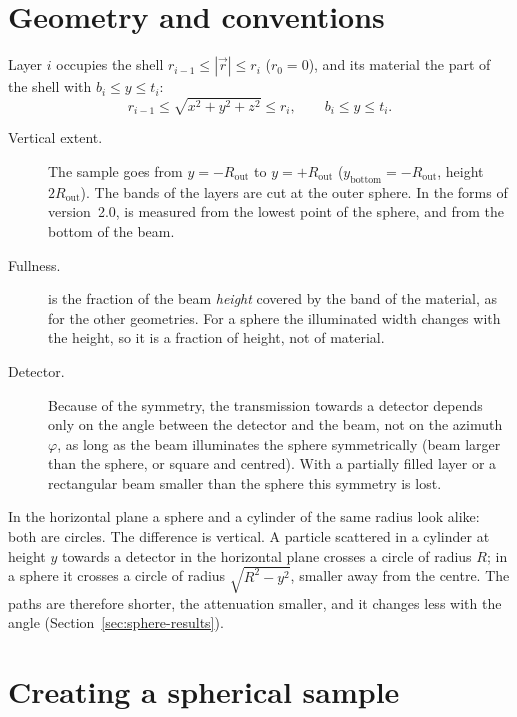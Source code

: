 \section{Geometry and conventions}

Layer $i$ occupies the shell $r_{i-1} \le |\vec r| \le r_i$ ($r_0=0$), and its material the part of the shell with
$b_i \le y \le t_i$:
\begin{equation}
  r_{i-1} \le \sqrt{x^2+y^2+z^2} \le r_i, \qquad b_i \le y \le t_i .
\end{equation}
\begin{description}
  \item[Vertical extent.] The sample goes from $y=-R_\mathrm{out}$ to $y=+R_\mathrm{out}$ ($y_\mathrm{bottom} = -R_\mathrm{out}$,
        height $2R_\mathrm{out}$). The bands of the layers are cut at the outer sphere. In the forms of version~2.0, 
        is measured from the lowest point of the sphere, and  from the bottom of the beam.
  \item[Fullness.]  is the fraction of the beam \emph{height} covered by the band of the material, as for the
        other geometries. For a sphere the illuminated width changes with the height, so it is a fraction of height, not of
        material.
  \item[Detector.] Because of the symmetry, the transmission towards a detector depends only on the angle between the detector and
        the beam, not on the azimuth $\varphi$, as long as the beam illuminates the sphere symmetrically (beam larger than the sphere, or
        square and centred). With a partially filled layer or a rectangular beam smaller than the sphere this symmetry is lost.
\end{description}

\begin{note}
In the horizontal plane a sphere and a cylinder of the same radius look alike: both are circles. The difference is vertical. A
particle scattered in a cylinder at height $y$ towards a detector in the horizontal plane crosses a circle of radius $R$; in a sphere it
crosses a circle of radius $\sqrt{R^2-y^2}$, smaller away from the centre. The paths are therefore shorter, the attenuation smaller, and
it changes less with the angle (Section~\ref{sec:sphere-results}).
\end{note}

\section{Creating a spherical sample}

